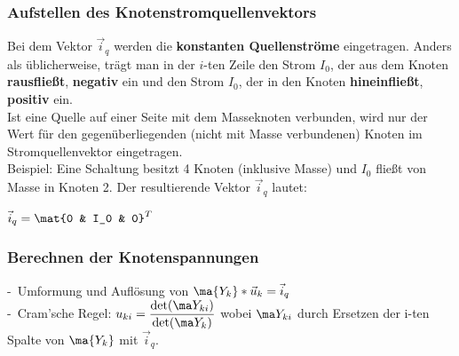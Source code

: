 \documentclass[fs, footer]{latex4ei}
\begin{document}
\begin{multicols*}{4}
    \subsubsection{Aufstellen des Knotenstromquellenvektors}
    Bei dem Vektor $\vec i_{q}$ werden die \textbf{konstanten Quellenströme} eingetragen.
    Anders als üblicherweise, trägt man in der $i$-ten Zeile den Strom $I_0$, der aus dem Knoten \textbf{rausfließt}, \textbf{negativ} ein und den Strom $I_0$, der in den Knoten \textbf{hineinfließt}, \textbf{positiv} ein.\\

    Ist eine Quelle auf einer Seite mit dem Masseknoten verbunden, wird nur der Wert für den gegenüberliegenden (nicht mit Masse verbundenen) Knoten im Stromquellenvektor eingetragen.\\

    Beispiel: Eine Schaltung besitzt 4 Knoten (inklusive Masse) und $I_0$ fließt von Masse in Knoten 2. Der resultierende Vektor $\vec i_q$ lautet:
    \begin{center} %
    $\vec i_{q} = \mat{0 & I_0 & 0}^T$
    \end{center}

    \subsubsection{Berechnen der Knotenspannungen}
    -\ Umformung und Auflösung von $\ma {Y_k} * \vec u_k = \vec i_q$\\
    -\ Cram'sche Regel: $u_{ki} = \frac{\det(\ma Y_{ki})}{\det(\ma Y_k)}$ wobei $\ma Y_{ki}$ durch Ersetzen der i-ten Spalte von $\ma {Y_k}$ mit $\vec i_q$.\\


\end{multicols*}
\end{document}
